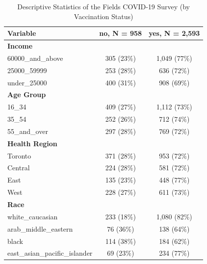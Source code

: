 \documentclass[
  letterpaper,
  DIV=11,
  numbers=noendperiod]{scrartcl}
\begin{document}
\hypertarget{tbl-descriptive-stats}{}
\begin{table}
\caption{\label{tbl-descriptive-stats}Descriptive Statistics of the Fields COVID-19 Survey (by Vaccination
Status) }\tabularnewline

\centering\begingroup\fontsize{9}{11}\selectfont

\begin{tabular}{lcc}
\toprule
\textbf{Variable} & \textbf{no}, N = 958 & \textbf{yes}, N = 2,593\\
\midrule
\textbf{Income} &  & \\
\hspace{1em}60000\_and\_above & 305 (23\%) & 1,049 (77\%)\\
\hspace{1em}25000\_59999 & 253 (28\%) & 636 (72\%)\\
\hspace{1em}under\_25000 & 400 (31\%) & 908 (69\%)\\
\textbf{Age Group} &  & \\
\hspace{1em}16\_34 & 409 (27\%) & 1,112 (73\%)\\
\hspace{1em}35\_54 & 252 (26\%) & 712 (74\%)\\
\hspace{1em}55\_and\_over & 297 (28\%) & 769 (72\%)\\
\textbf{Health Region} &  & \\
\hspace{1em}Toronto & 371 (28\%) & 953 (72\%)\\
\hspace{1em}Central & 224 (28\%) & 581 (72\%)\\
\hspace{1em}East & 135 (23\%) & 448 (77\%)\\
\hspace{1em}West & 228 (27\%) & 611 (73\%)\\
\textbf{Race} &  & \\
\hspace{1em}white\_caucasian & 233 (18\%) & 1,080 (82\%)\\
\hspace{1em}arab\_middle\_eastern & 76 (36\%) & 138 (64\%)\\
\hspace{1em}black & 114 (38\%) & 184 (62\%)\\
\hspace{1em}east\_asian\_pacific\_islander & 69 (23\%) & 234 (77\%)\\

\end{tabular}
\end{table}
\end{document}

